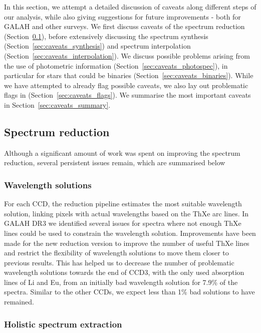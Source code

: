 \documentclass[
  journal=pasa,
  manuscript=research-paper, %
  year=2024,
  volume=37
]{cup-journal}
\begin{document}
In this section, we attempt a detailed discussion of caveats along different steps of our analysis, while also giving suggestions for future improvements - both for GALAH and other surveys. We first discuss caveats of the spectrum reduction (Section~\ref{sec:caveats_reduction}), before extensively discussing the spectrum synthesis (Section~\ref{sec:caveats_synthesis}) and spectrum interpolation (Section~\ref{sec:caveats_interpolation}). We discuss possible problems arising from the use of photometric information (Section~\ref{sec:caveats_photospec}), in particular for stars that could be binaries (Section~\ref{sec:caveats_binaries}). While we have attempted to already flag possible caveats, we also lay out problematic flags in (Section~\ref{sec:caveats_flags}). We summarise the most important caveats in Section~\ref{sec:caveats_summary}.

\subsection{Spectrum reduction}  \label{sec:caveats_reduction}

Although a significant amount of work was spent on improving the spectrum reduction, several persistent issues remain, which are summarised below

\subsubsection{Wavelength solutions}

For each CCD, the reduction pipeline estimates the most suitable wavelength solution, linking pixels with actual wavelengths based on the ThXe arc lines. In GALAH DR3 \citep{Buder2021} we identified several issues for spectra where not enough ThXe lines could be used to constrain the wavelength solution. Improvements have been made for the new reduction version to improve the number of useful ThXe lines and restrict the flexibility of wavelength solutions to move them closer to previous results. This has helped us to decrease the number of problematic wavelength solutions towards the end of CCD3, with the only used absorption lines of Li and Eu, from an initially bad wavelength solution for 7.9\% of the spectra. Similar to the other CCDs, we expect less than 1\% bad solutions to have remained.

\subsubsection{Holistic spectrum extraction}
\end{document}
